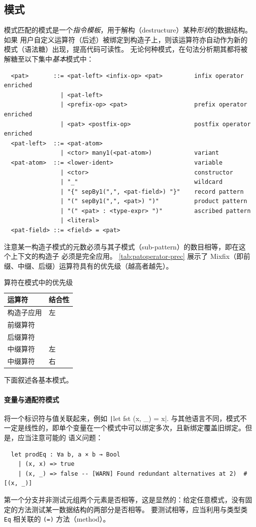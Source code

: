 \documentclass[a4paper, 11pt]{article}
\theoremstyle{remark}\newtheorem*{remark}{Remark}
\theoremstyle{definition}\newtheorem*{definition}{Definition}
\begin{document}
\subsection{模式}
模式匹配的模式是一个\emph{指令模板}，用于解构（destructure）某种\emph{形状}的数据结构。如果
用户自定义运算符（后述）被绑定到构造子上，则该运算符亦自动作为新的模式（语法糖）出现，提高代码可读性。
无论何种模式，在句法分析期其都将被解糖至以下集中\emph{基本}模式中：
\begin{verbatim}
  <pat>       ::= <pat-left> <infix-op> <pat>         infix operator enriched
                | <pat-left>
                | <prefix-op> <pat>                   prefix operator enriched
                | <pat> <postfix-op>                  postfix operator enriched
  <pat-left>  ::= <pat-atom>
                | <ctor> many1(<pat-atom>)            variant
  <pat-atom>  ::= <lower-ident>                       variable
                | <ctor>                              constructor
                | "_"                                 wildcard
                | "{" sepBy1(",", <pat-field>) "}"    record pattern
                | "(" sepBy1(",", <pat>) ")"          product pattern
                | "(" <pat> : <type-expr> ")"         ascribed pattern
                | <literal>
  <pat-field> ::= <field> = <pat>
\end{verbatim}
注意某一构造子模式的元数必须与其子模式（sub-pattern）的数目相等，即在这个上下文的构造子
必须是完全应用。
\autoref{tab:patoperator-prec} 展示了 Mixfix（即前缀、中缀、后缀）运算符具有的优先级（越高者越先）。
\begin{table}[]
  \centering
  \begin{tabular}{@{}ll@{}}
    \toprule
    运算符                & 结合性 \\ \midrule
    构造子应用 & 左          \\
    前缀算符         &               \\
    后缀算符        &               \\
    中缀算符          & 左          \\
    中缀算符          & 右         \\ \bottomrule
  \end{tabular}
  \caption{算符在模式中的优先级}\label{tab:patoperator-prec}
\end{table}

下面叙述各基本模式。

\paragraph*{变量与通配符模式} 将一个标识符与值关联起来，例如 \texttt|let fst (x, _) = x|.
与其他语言不同，模式不一定是线性的，即单个变量在一个模式中可以绑定多次，且新绑定覆盖旧绑定。但是，应当注意可能的
语义问题：
\begin{verbatim}
  let prodEq : ∀a b, a × b → Bool
    | (x, x) => true
    | (x, _) => false -- [WARN] Found redundant alternatives at 2)  #[(x, _)]
\end{verbatim}
第一个分支并非测试元组两个元素是否相等，这是显然的：给定任意模式，没有固定的方法测试某一数据结构的两部分是否相等。
要测试相等，应当利用与类型类 \texttt{Eq} 相关联的 \texttt{(=)} 方法（method）。
\end{document}
